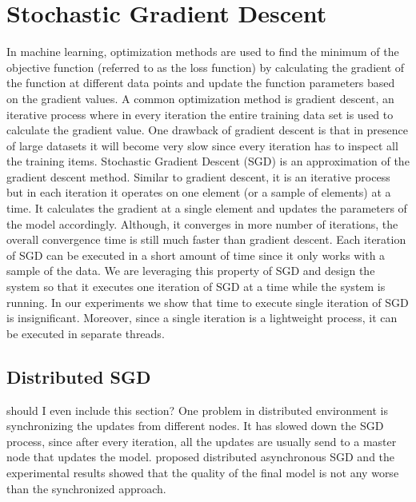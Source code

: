 \documentclass{sig-alternate-05-2015}
\begin{document}
\section{Stochastic Gradient Descent} \label{sgd}
In machine learning, optimization methods are used to find the minimum of the objective function (referred to as the loss function) by calculating the gradient of the function at different data points and update the function parameters based on the gradient values.
A common optimization method is gradient descent, an iterative process where in every iteration the entire training data set is used to calculate the gradient value.
One drawback of gradient descent is that in presence of large datasets it will become very slow since every iteration has to inspect all the training items.
Stochastic Gradient Descent (SGD) is an approximation of the gradient descent method. 
Similar to gradient descent, it is an iterative process but in each iteration it operates on one element (or a sample of elements) at a time. 
It calculates the gradient at a single element and updates the parameters of the model accordingly. 
Although, it converges in more number of iterations, the overall convergence time is still much faster than gradient descent. 
Each iteration of SGD can be executed in a short amount of time since it only works with a sample of the data.
We are leveraging this property of SGD and design the system so that it executes one iteration of SGD at a time while the system is running.
In our experiments we show that time to execute single iteration of SGD is insignificant.
Moreover, since a single iteration is a lightweight process, it can be executed in separate threads.

\subsection{Distributed SGD}
{\color{red} should I even include this section?}
One problem in distributed environment is synchronizing the updates from different nodes. 
It has slowed down the SGD process, since after every iteration, all the updates are usually send to a master node that updates the model.
\cite{recht2011hogwild, dean2012large} proposed distributed asynchronous SGD and the experimental results showed that the quality of the final model is not any worse than the synchronized approach. 
\end{document}
